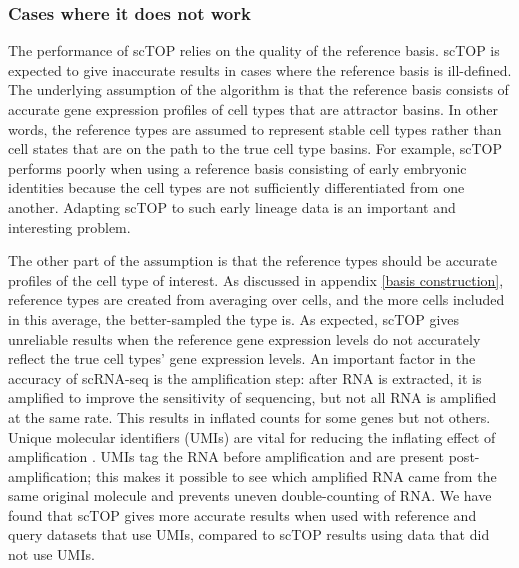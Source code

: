 \documentclass[aps,superscriptaddress, notitlepage,longbibliography]{revtex4-1}
\begin{document}
\subsubsection{Cases where it does not work}\label{failure_cases}
The performance of scTOP relies on the quality of the reference basis. scTOP is expected to give inaccurate results in cases where the reference basis is ill-defined. The underlying assumption of the algorithm is that the reference basis consists of accurate gene expression profiles of cell types that are attractor basins. In other words, the reference types are assumed to represent stable cell types rather than cell states that are on the path to the true cell type basins. For example, scTOP performs poorly when using a reference basis consisting of early embryonic identities because the cell types are not sufficiently differentiated from one another. Adapting scTOP to such early lineage data is an important and interesting problem.

The other part of the assumption is that the reference types should be accurate profiles of the cell type of interest. As discussed in appendix \ref{basis construction}, reference types are created from averaging over cells, and the more cells included in this average, the better-sampled the type is. As expected, scTOP gives unreliable results when the reference gene expression levels do not accurately reflect the true cell types' gene expression levels. An important factor in the accuracy of scRNA-seq is the amplification step: after RNA is extracted, it is amplified to improve the sensitivity of sequencing, but not all RNA is amplified at the same rate. This results in inflated counts for some genes but not others. Unique molecular identifiers (UMIs) are vital for reducing the inflating effect of amplification \cite{islam2014quantitative}. UMIs tag the RNA before amplification and are present post-amplification; this makes it possible to see which amplified RNA came from the same original molecule and prevents uneven double-counting of RNA. We have found that scTOP gives more accurate results when used with reference and query datasets that use UMIs, compared to scTOP results using data that did not use UMIs.
\end{document}
